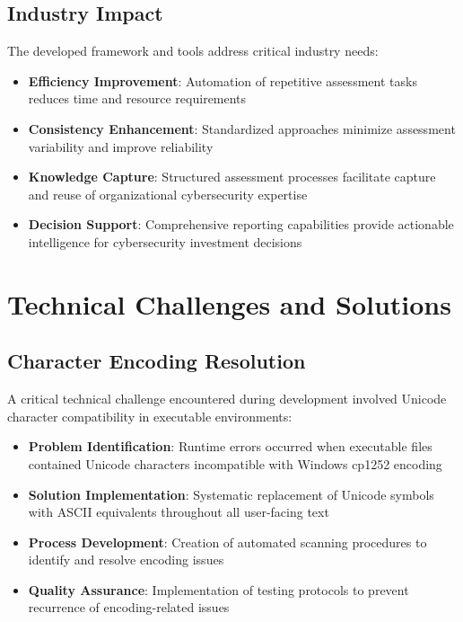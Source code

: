 \documentclass[binding=0.6cm]{sapthesis}
\begin{document}
\subsection{Industry Impact}

The developed framework and tools address critical industry needs:

\begin{itemize}
    \item \textbf{Efficiency Improvement}: Automation of repetitive assessment tasks reduces time and resource requirements
    \item \textbf{Consistency Enhancement}: Standardized approaches minimize assessment variability and improve reliability
    \item \textbf{Knowledge Capture}: Structured assessment processes facilitate capture and reuse of organizational cybersecurity expertise
    \item \textbf{Decision Support}: Comprehensive reporting capabilities provide actionable intelligence for cybersecurity investment decisions
\end{itemize}

\section{Technical Challenges and Solutions}

\subsection{Character Encoding Resolution}

A critical technical challenge encountered during development involved Unicode character compatibility in executable environments:

\begin{itemize}
    \item \textbf{Problem Identification}: Runtime errors occurred when executable files contained Unicode characters incompatible with Windows cp1252 encoding
    \item \textbf{Solution Implementation}: Systematic replacement of Unicode symbols with ASCII equivalents throughout all user-facing text
    \item \textbf{Process Development}: Creation of automated scanning procedures to identify and resolve encoding issues
    \item \textbf{Quality Assurance}: Implementation of testing protocols to prevent recurrence of encoding-related issues
\end{itemize}
\end{document}
